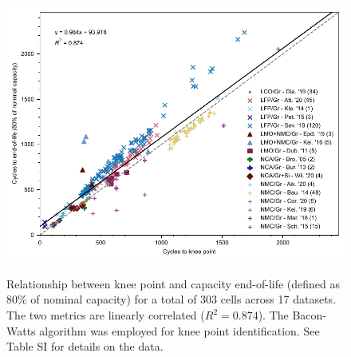 \documentclass[journal=jpclcd,manuscript=article]{achemso}
\newcommand{\cmark}{\textcolor{blue}{\textrm{\ding{52}}}}%
\newcommand{\gbox}[1]{{
\fbox{
\parbox{0.8\textwidth}{  \fbox{$\triangleright$\textcolor{blue}{\textbf{Gon}:}} 
#1
}}}}
\begin{document}

\begin{figure}[ht]
\centering
\includegraphics[scale=1.0]{final_figures/knee_point_eol_linear_relations.pdf}
  \label{fig:kneepoint2EOL}
\caption{Relationship between knee point and capacity end-of-life (defined as 80\% of nominal capacity) for a total of 303 cells across 17 datasets. The two metrics are linearly correlated ($R^2 = 0.874$). The Bacon-Watts algorithm was employed for knee point identification. See Table SI for details on the data.}
\label{fig:knees2EOL}
\end{figure}


\end{document}
